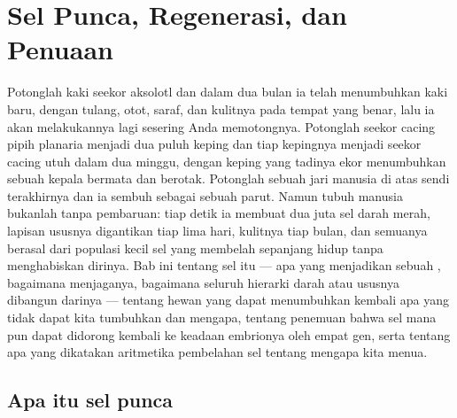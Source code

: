 \chapter{Sel Punca, Regenerasi, dan Penuaan}\label{ch:b3:stem-cells}

Potonglah kaki seekor aksolotl dan dalam dua bulan ia telah menumbuhkan kaki baru,
dengan tulang, otot, saraf, dan kulitnya pada tempat yang benar, lalu ia akan melakukannya
lagi sesering Anda memotongnya. Potonglah seekor cacing pipih planaria menjadi dua puluh keping
dan tiap kepingnya menjadi seekor cacing utuh dalam dua minggu, dengan keping yang tadinya
ekor menumbuhkan sebuah kepala bermata dan berotak. Potonglah sebuah jari manusia
di atas sendi terakhirnya dan ia sembuh sebagai sebuah parut. Namun tubuh manusia
bukanlah tanpa pembaruan: tiap detik ia membuat dua juta sel darah
merah, lapisan ususnya digantikan tiap lima hari, kulitnya
tiap bulan, dan semuanya berasal dari populasi kecil sel
yang membelah sepanjang hidup tanpa menghabiskan dirinya. Bab
ini tentang sel itu --- apa yang menjadikan sebuah , bagaimana 
menjaganya, bagaimana seluruh hierarki darah atau ususnya dibangun darinya ---
tentang hewan yang dapat menumbuhkan kembali apa yang tidak dapat kita tumbuhkan dan mengapa, tentang
penemuan bahwa sel mana pun dapat didorong kembali ke keadaan embrionya oleh
empat gen, serta tentang apa yang dikatakan aritmetika pembelahan sel
tentang mengapa kita menua.

\section{Apa itu sel punca}

